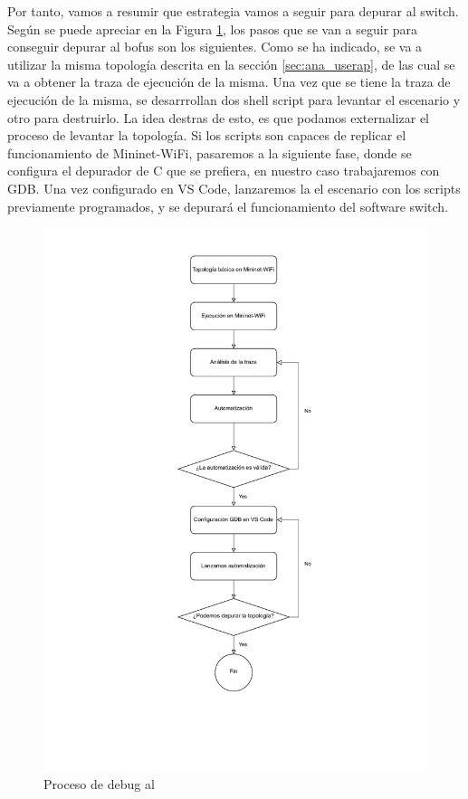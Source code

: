 Por tanto, vamos a resumir que estrategia vamos a seguir para depurar al switch. Según se puede apreciar en la Figura \ref{fig:debugBOFUSS}, los pasos que se van a seguir para conseguir depurar al \gls{bofus} son los siguientes. Como se ha indicado, se va a utilizar la misma topología descrita en la sección \ref{sec:ana_userap}, de las cual se va a obtener la traza de ejecución de la misma. Una vez que se tiene la traza de ejecución de la misma, se desarrrollan dos shell script para levantar el escenario y otro para destruirlo. La idea destras de esto, es que podamos externalizar el proceso de levantar la topología. Si los scripts son capaces de replicar el funcionamiento de Mininet-WiFi, pasaremos a la siguiente fase, donde se configura el depurador de C que se prefiera, en nuestro caso trabajaremos con GDB. Una vez configurado en VS Code, lanzaremos la el escenario con los scripts previamente programados, y se depurará el funcionamiento del software switch.

\begin{figure}[ht!]
    \centering
    \includegraphics[width=\textwidth]{archivos/img/analisis/debugBOFUSS.drawio.pdf}
    \caption{Proceso de debug al }
    \label{fig:debugBOFUSS}
\end{figure}

